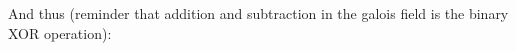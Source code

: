 And thus (reminder that addition and subtraction in the galois field is the binary XOR operation):
\begin{comment}
\[
  \def\arraystretch{1.5}
  \begin{array}{rrrrrrrrrrrrr}
     67 &  111 &  100 & 101 &  115 &    0 &    0 &    0 &\divline{}&   1 &   7 & 14 &  8 \\
    \cline{9-13}
    -67 & -212 & -181 & -34 &      &      &      &      &       67 & 187 & 215 & 84 & 77 \\
    \cline{1-4}
        &  187 &  209 &  71 &  115 &      &      &      &          &     &     &    & \\
        & -187 &   -6 & -12 & -177 &      &      &      &          &     &     &    & \\
    \cline{2-5}
        &      &  215 &  75 &  194 &    0 &      &      &          &     &     &    & \\
        &      & -215 & -31 &  -52 & -246 &      &      &          &     &     &    & \\
    \cline{3-6}
        &      &      &  84 &  252 &  246 &    0 &      &          &     &     &    & \\
        &      &      & -84 & -177 & -127 & -154 &      &          &     &     &    & \\
    \cline{4-7}
        &      &      &     &   77 &  137 &  154 &    0 &          &     &     &    & \\
        &      &      &     &  -77 & -254 & -225 &  -82 &          &     &     &    & \\
    \cline{5-8}
        &      &      &     &      &  119 &  123 &   82 &          &     &     &    &
  \end{array}
  \def\arraystretch{1}
\]
\[
  \Rightarrow E_c(x) = 119x^2 + 123x + 82
\]
\end{comment}

